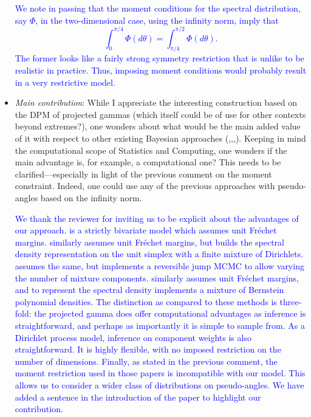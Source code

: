 \documentclass[10pt]{article}
\newcommand{\response}[1]{\textcolor{blue}{#1}}
\begin{document}
\begin{itemize}
\response{We note in passing that the moment conditions for the spectral distribution, say 
    $\Phi$, in the two-dimensional case, using the infinity norm, imply that 
    \[
        \int_0^{\pi/4} \Phi(d\theta) = \int_{\pi/4}^{\pi/2}
    \Phi(d\theta).
    \]
    The former looks like a fairly strong symmetry restriction that is unlike to 
    be realistic in practice. Thus, imposing moment conditions would probably 
    result in a very restrictive model.
    }

\item \emph{Main contribution}: While I appreciate the interesting construction 
    based on the DPM of projected gammas (which itself could be of use for other 
    contexts beyond extremes?), one wonders about what would be the main added 
    value of it with respect to other existing Bayesian approaches 
    (\cite{boldi2007},\cite{guillotte2011},\cite{SaNa2014},\cite{hanson2017}).
    Keeping in mind the computational scope of Statistics and Computing, one 
    wonders if the main advantage is, for example, a computational one? This 
    needs to be clarified—especially in light of the previous comment on the 
    moment constraint. Indeed, one could use any of the previous approaches with 
    pseudo-angles based on the infinity norm.

\response{We thank the reviewer for inviting us to be explicit about the advantages of 
    our approach. \cite{guillotte2011} is a strictly bivariate model which assumes
    unit Fr\'{e}chet margins.  \cite{boldi2007} similarly assumes unit Fr\'{e}chet
    margins, but builds the spectral density representation on the unit simplex with
    a finite mixture of Dirichlets.  \cite{SaNa2014} assumes the same, but implements
    a reversible jump MCMC to allow varying the number of mixture components.
    \cite{hanson2017} similarly assumes unit Fr\'{e}chet margins, and to represent
    the spectral density implements a mixture of Bernstein polynomial densities.
    The distinction as compared to these methods is three-fold: the projected gamma does
    offer computational advantages as inference is straightforward, and perhaps as 
    importantly it is simple to sample from.  As a Dirichlet process model, inference
    on component weights is also straightforward.  It is highly flexible, with no
    imposed restriction on the number of dimensions.  Finally, as stated in the previous
    comment, the moment restriction used in those papers is incompatible with our model.
    This allows us to consider a wider class of distributions on pseudo-angles.
    We have added a sentence in the introduction of the paper to highlight our 
    contribution.
    }
    

\end{itemize}
\end{document}
